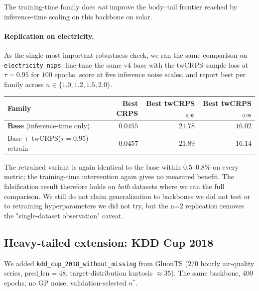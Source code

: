 \documentclass{article}
\begin{document}
The training-time family does \emph{not} improve the body--tail
frontier reached by inference-time scaling on this backbone on
solar.

\paragraph{Replication on electricity.} As the single most
important robustness check, we ran the same comparison on
\texttt{electricity\_nips}: fine-tune the same v4 base with the
twCRPS sample loss at $\tau{=}0.95$ for $100$ epochs, score at
five inference noise scales, and report best per family across
$n \in \{1.0, 1.2, 1.5, 2.0\}$.

\begin{center}
\small
\begin{tabular}{lrrr}
\toprule
Family & Best CRPS & Best twCRPS$_{0.95}$ & Best twCRPS$_{0.99}$ \\
\midrule
\textbf{Base} (inference-time only) & $\mathbf{0.0455}$ & $\mathbf{21.78}$ & $\mathbf{16.02}$ \\
Base + twCRPS($\tau{=}0.95$) retrain & $0.0457$ & $21.89$ & $16.14$ \\
\bottomrule
\end{tabular}
\end{center}

The retrained variant is again identical to the base within $0.5$--$0.8\%$
on every metric; the training-time intervention again gives no
measured benefit. The falsification result therefore holds on
\emph{both} datasets where we ran the full comparison. We still
do not claim generalization to backbones we did not test or to
retraining hyperparameters we did not try, but the n=2 replication
removes the "single-dataset observation" caveat.

\subsection{Heavy-tailed extension: KDD Cup 2018}
\label{sec:kdd}

We added \texttt{kdd\_cup\_2018\_without\_missing} from GluonTS
($270$ hourly air-quality series, $\mathrm{pred\_len}=48$,
target-distribution kurtosis $\approx 35$). The same backbone, $400$
epochs, no GP noise, validation-selected $n^*$.
\end{document}
